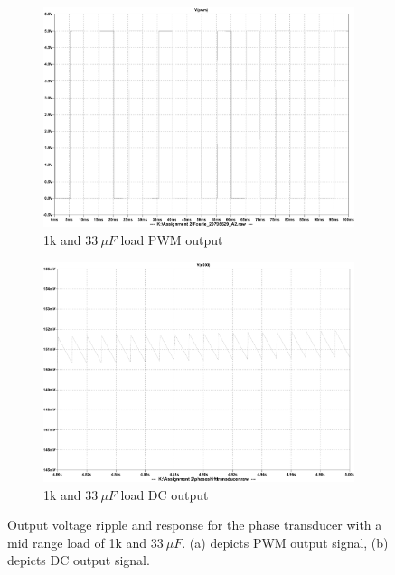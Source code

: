  \begin{figure}[h!]
 \centering
      \begin{subfigure}[]{0.45\textwidth}
              \centering
  		\includegraphics[width=1\linewidth]{./Figures/phasetransducer1k33u.pdf}
		    \caption{1k and $\SI{33}{\mu F}$ load PWM output} \label{subfig:phasetransducer1k33u}
     \end{subfigure}
     \begin{subfigure}[]{0.45\textwidth}
        \centering
         \includegraphics[width=1\linewidth]{./Figures/phaseshifttransducermiddanalogout.pdf}
		    \caption{1k and $\SI{33}{\mu F}$ load DC output} \label{subfig:phasetransducer1k33uout}
     \end{subfigure}
   \caption[Simulated results for the phase transducer with a mid range + $\delta$ load]{Output voltage ripple and response for the phase transducer with a mid range load of 1k and $\SI{33}{\mu F}$. (a) depicts PWM output signal, (b) depicts DC output signal. }
    \label{fig:simulation_results_box}
 \end{figure}

